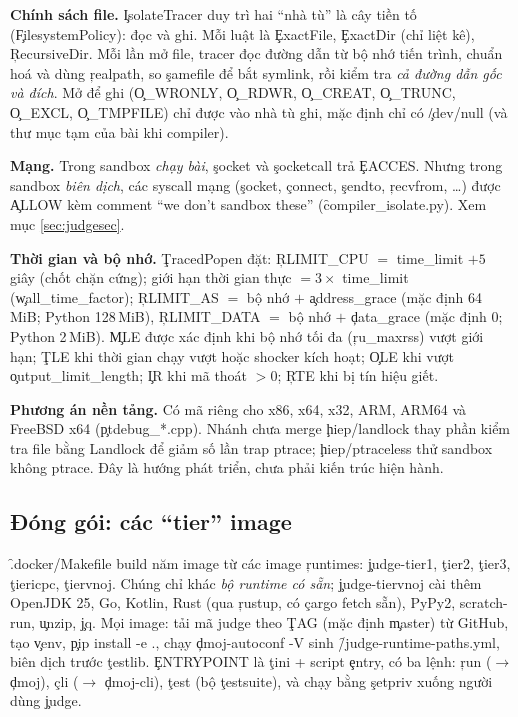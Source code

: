 \textbf{Chính sách file.} \c{IsolateTracer} duy trì hai ``nhà tù'' là cây tiền tố (\c{FilesystemPolicy}): đọc và ghi. Mỗi luật là \c{ExactFile}, \c{ExactDir} (chỉ liệt kê), \c{RecursiveDir}. Mỗi lần mở file, tracer đọc đường dẫn từ bộ nhớ tiến trình, chuẩn hoá và dùng \c{realpath}, so \c{samefile} để bắt symlink, rồi kiểm tra \emph{cả đường dẫn gốc và đích}. Mở để ghi (\c{O_WRONLY}, \c{O_RDWR}, \c{O_CREAT}, \c{O_TRUNC}, \c{O_EXCL}, \c{O_TMPFILE}) chỉ được vào nhà tù ghi, mặc định chỉ có \c{/dev/null} (và thư mục tạm của bài khi compiler). \tS

\textbf{Mạng.} Trong sandbox \emph{chạy bài}, \c{socket} và \c{socketcall} trả \c{EACCES}. Nhưng trong sandbox \emph{biên dịch}, các syscall mạng (\c{socket}, \c{connect}, \c{sendto}, \c{recvfrom}, \ldots) được \c{ALLOW} kèm comment ``we don't sandbox these'' (\f{compiler_isolate.py}). Xem mục \ref{sec:judgesec}. \tS

\textbf{Thời gian và bộ nhớ.} \c{TracedPopen} đặt: \c{RLIMIT_CPU} $=$ time\_limit $+ 5$ giây (chốt chặn cứng); giới hạn thời gian thực $=3\times$ time\_limit (\c{wall_time_factor}); \c{RLIMIT_AS} $=$ bộ nhớ $+$ \c{address_grace} (mặc định 64\,MiB; Python 128\,MiB), \c{RLIMIT_DATA} $=$ bộ nhớ $+$ \c{data_grace} (mặc định 0; Python 2\,MiB). \c{MLE} được xác định khi bộ nhớ tối đa (\c{ru_maxrss}) vượt giới hạn; \c{TLE} khi thời gian chạy vượt hoặc shocker kích hoạt; \c{OLE} khi vượt \c{output_limit_length}; \c{IR} khi mã thoát $>0$; \c{RTE} khi bị tín hiệu giết. \tS

\textbf{Phương án nền tảng.} Có mã riêng cho x86, x64, x32, ARM, ARM64 và FreeBSD x64 (\c{ptdebug_*.cpp}). Nhánh chưa merge \c{hiep/landlock} thay phần kiểm tra file bằng Landlock để giảm số lần trap ptrace; \c{hiep/ptraceless} thử sandbox không ptrace. Đây là hướng phát triển, chưa phải kiến trúc hiện hành. \tS

\subsection{Đóng gói: các ``tier'' image}\label{sec:docker}
\f{.docker/Makefile} build năm image từ các image \c{runtimes}: \c{judge-tier1}, \c{tier2}, \c{tier3}, \c{tiericpc}, \c{tiervnoj}. Chúng chỉ khác \emph{bộ runtime có sẵn}; \c{judge-tiervnoj} cài thêm OpenJDK 25, Go, Kotlin, Rust (qua \c{rustup}, có \c{cargo fetch} sẵn), PyPy2, scratch-run, \c{unzip}, \c{jq}. Mọi image: tải mã judge theo \c{TAG} (mặc định \c{master}) từ GitHub, tạo \c{venv}, \c{pip install -e .}, chạy \c{dmoj-autoconf -V} sinh \f{/judge-runtime-paths.yml}, biên dịch trước \c{testlib}. \c{ENTRYPOINT} là \c{tini} + script \c{entry}, có ba lệnh: \c{run} ($\to$ \c{dmoj}), \c{cli} ($\to$ \c{dmoj-cli}), \c{test} (bộ \c{testsuite}), và chạy bằng \c{setpriv} xuống người dùng \c{judge}. \tS

